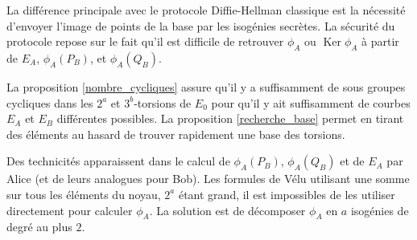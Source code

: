 \documentclass{article}
\theoremstyle{plain}%
\theoremstyle{definition}%
\DeclareMathOperator{\Ker}{Ker}
\begin{document}
\begin{center}
\end{center}

La différence principale avec le protocole Diffie-Hellman classique est la nécessité d'envoyer l'image de points de la base par les isogénies secrètes. 
La sécurité du protocole repose sur le fait qu'il est difficile de retrouver $\phi_A$ ou $\Ker\phi_A$ à partir de $E_A$, $\phi_A(P_B)$, et $\phi_A(Q_B)$.

La proposition \ref{nombre_cycliques} assure qu'il y a suffisamment de sous groupes cycliques dans les $2^a$ et $3^b$-torsions de $E_0$ pour qu'il y ait suffisamment de courbes $E_A$ et $E_B$ différentes possibles. La proposition \ref{recherche_base} permet en tirant des éléments au hasard de trouver rapidement une base des torsions.

Des technicités apparaissent dans le calcul de $\phi_A(P_B)$, $\phi_A(Q_B)$ et de $E_A$ par Alice (et de leurs analogues pour Bob). Les formules de Vélu utilisant une somme sur tous les éléments du noyau, $2^a$ étant grand, il est impossibles de les utiliser directement pour calculer $\phi_A$. La solution est de décomposer $\phi_A$ en $a$ isogénies de degré au plus $2$.
\end{document}
